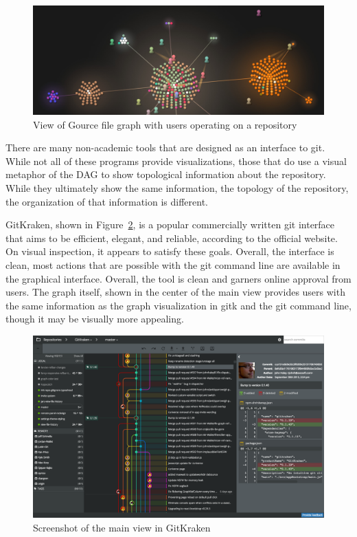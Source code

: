 \begin{figure}[htpb]
  \centering
  \includegraphics[width=0.8\linewidth]{./Figures/introduction/gource-linux.jpg}
  \caption{View of Gource file graph with users operating on a
    repository}
  \label{fig:gource_view}
\end{figure}

There are many non-academic tools that are designed as an interface to
git. While not all of these programs provide visualizations, those that
do use a visual metaphor of the DAG to show topological information
about the repository. While they ultimately show the same information,
the topology of the repository, the organization of that information is
different.

GitKraken, shown in Figure~\ref{fig:gitkraken_main},  is a popular
commercially written git interface that aims to be efficient, elegant,
and reliable, according to the official website. On visual inspection,
it appears to satisfy these goals. Overall, the interface is clean, most
actions that are possible with the git command line are available in the
graphical interface. Overall, the tool is clean and garners online
approval from users. The graph itself, shown in the center of the main
view provides users with the same information as the graph visualization
in gitk and the git command line, though it may be visually more
appealing.

\begin{figure}[htpb]
  \centering
  \includegraphics[width=0.8\linewidth]{Figures/introduction/gitkraken_main.png}
  \caption{Screenshot of the main view in GitKraken}
  \label{fig:gitkraken_main}
\end{figure}

